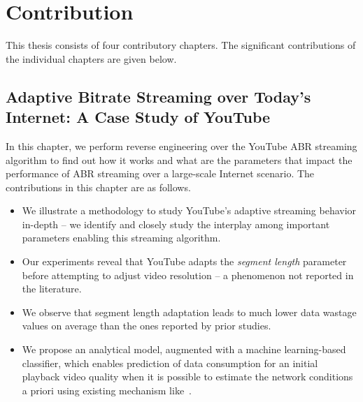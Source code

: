 \section{Contribution}
This thesis consists of four contributory chapters. The significant contributions of the individual chapters are given below. 

\subsection{Adaptive Bitrate Streaming over Today's Internet: A Case Study of YouTube}
In this chapter, we perform reverse engineering over the YouTube \ac{ABR} streaming algorithm to find out how it works and what are the parameters that impact the performance of \ac{ABR} streaming over a large-scale Internet scenario. The contributions in this chapter are as follows. 
\begin{itemize}
	\item We illustrate a methodology to study YouTube's adaptive streaming behavior in-depth -- we identify and closely study the interplay among important parameters enabling this streaming algorithm.
	\item Our experiments reveal that YouTube adapts the {\it segment length} parameter before attempting to adjust video resolution -- a phenomenon not reported in the literature.
	\item We observe that segment length adaptation leads to much lower data wastage values on average than the ones reported by prior studies.
	\item We propose an analytical model, augmented with a machine learning-based classifier, which enables prediction of data consumption for an initial playback video quality when it is possible to estimate the network conditions a priori using existing mechanism like~\cite{Zou2015}.
\end{itemize}

